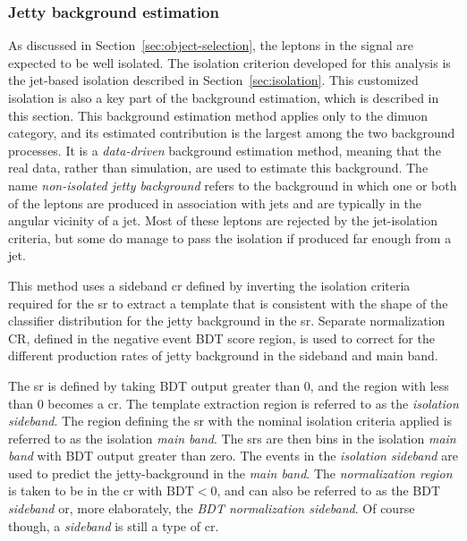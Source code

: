 \clearpage
\subsubsection{Jetty background estimation}
\label{sec:jetty-background-estimation}

As discussed in Section~\ref{sec:object-selection}, the leptons in the signal are expected to be well isolated. The isolation criterion developed for this analysis is the jet-based isolation described in Section~\ref{sec:isolation}. This customized isolation is also a key part of the background estimation, which is described in this section. This background estimation method applies only to the dimuon category, and its estimated contribution is the largest among the two background processes. It is a \emph{data-driven} background estimation method, meaning that the real data, rather than simulation, are used to estimate this background. The name \emph{non-isolated jetty background} refers to the background in which one or both of the leptons are produced in association with jets and are typically in the angular vicinity of a jet. Most of these leptons are rejected by the jet-isolation criteria, but some do manage to pass the isolation if produced far enough from a jet.

This method uses a sideband \gls{cr} defined by inverting the isolation criteria required for the \gls{sr} to extract a template that is consistent with the shape of the classifier distribution for the jetty background in the \gls{sr}. Separate normalization CR, defined in the negative event BDT score region, is used to correct for the different production rates of jetty background in the sideband and main band.

The \gls{sr} is defined by taking BDT output greater than 0, and the region with less than 0 becomes a \gls{cr}. The template extraction region is referred to as the \emph{isolation sideband}. The region defining the \gls{sr} with the nominal isolation criteria applied is referred to as the isolation \emph{main band}. The \glspl{sr} are then bins in the isolation \emph{main band} with BDT output greater than zero. The events in the \emph{isolation sideband} are used to predict the jetty-background in the \emph{main band}. The \emph{normalization region} is taken to be in the \gls{cr} with $\mathrm{BDT}<0$, and can also be referred to as the BDT \emph{sideband} or, more elaborately, the \emph{BDT normalization sideband}. Of course though, a \emph{sideband} is still a type of \gls{cr}.

